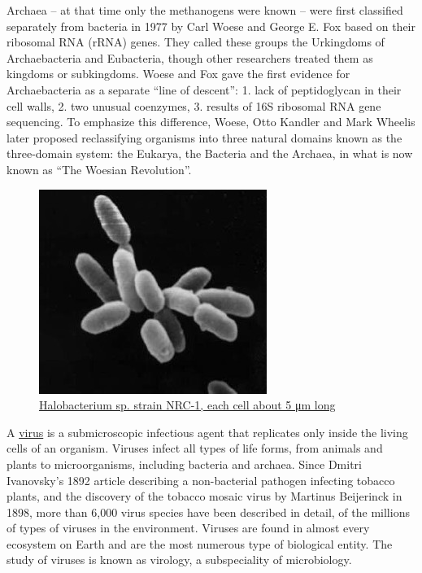 Archaea -- at that time only the methanogens were known -- were first classified separately from bacteria in 1977 by Carl Woese and George E. Fox based on their ribosomal RNA (rRNA) genes. They called these groups the Urkingdoms of Archaebacteria and Eubacteria, though other researchers treated them as kingdoms or subkingdoms. Woese and Fox gave the first evidence for Archaebacteria as a separate ``line of descent'': 1. lack of peptidoglycan in their cell walls, 2. two unusual coenzymes, 3. results of 16S ribosomal RNA gene sequencing. To emphasize this difference, Woese, Otto Kandler and Mark Wheelis later proposed reclassifying organisms into three natural domains known as the three-domain system: the Eukarya, the Bacteria and the Archaea, in what is now known as ``The Woesian Revolution''.



\begin{figure}

{\centering \includegraphics[width=0.7\linewidth]{./figures/bacteria/Halobacteria} 

}

\caption{\href{https://commons.wikimedia.org/wiki/File:Halobacteria.jpg}{Halobacterium sp. strain NRC-1, each cell about 5 μm long}}\label{fig:haloarchaea}
\end{figure}

A \href{https://en.wikipedia.org/wiki/Virus}{virus} is a submicroscopic infectious agent that replicates only inside the living cells of an organism. Viruses infect all types of life forms, from animals and plants to microorganisms, including bacteria and archaea. Since Dmitri Ivanovsky's 1892 article describing a non-bacterial pathogen infecting tobacco plants, and the discovery of the tobacco mosaic virus by Martinus Beijerinck in 1898, more than 6,000 virus species have been described in detail, of the millions of types of viruses in the environment. Viruses are found in almost every ecosystem on Earth and are the most numerous type of biological entity. The study of viruses is known as virology, a subspeciality of microbiology.



